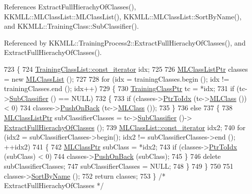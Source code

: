 References Extract\+Full\+Hierachy\+Of\+Classes(), K\+K\+M\+L\+L\+::\+M\+L\+Class\+List\+::\+M\+L\+Class\+List(), K\+K\+M\+L\+L\+::\+M\+L\+Class\+List\+::\+Sort\+By\+Name(), and K\+K\+M\+L\+L\+::\+Training\+Class\+::\+Sub\+Classifier().



Referenced by K\+K\+M\+L\+L\+::\+Training\+Process2\+::\+Extract\+Full\+Hierachy\+Of\+Classes(), and Extract\+Full\+Hierachy\+Of\+Classes().


\begin{DoxyCode}
723 \{
724   \hyperlink{class_k_k_b_1_1_k_k_queue_aeb057c9c010446f46f57c1e355f981f1}{TrainingClassList::const\_iterator}  idx;
725 
726   \hyperlink{class_k_k_m_l_l_1_1_m_l_class_list}{MLClassListPtr}  classes = \textcolor{keyword}{new} \hyperlink{class_k_k_m_l_l_1_1_m_l_class_list}{MLClassList} ();
727 
728   \textcolor{keywordflow}{for}  (idx = trainingClasses.begin ();  idx != trainingClasses.end ();  idx++)
729   \{
730     \hyperlink{class_k_k_m_l_l_1_1_training_class}{TrainingClassPtr}  tc = *idx;
731     \textcolor{keywordflow}{if}  (tc->\hyperlink{class_k_k_m_l_l_1_1_training_class_a0e7f742efd6c2cd406f57da6622a02d7}{SubClassifier} () == NULL)
732     \{
733       \textcolor{keywordflow}{if}  (classes->\hyperlink{class_k_k_b_1_1_k_k_queue_ac7c26abdf599669a4b0898534f735f99}{PtrToIdx} (tc->\hyperlink{class_k_k_m_l_l_1_1_training_class_a2f28d3ab6694f610fceeacd94ffee4ad}{MLClass} ()) < 0)
734         classes->\hyperlink{class_k_k_m_l_l_1_1_m_l_class_list_ae46d4f51c041d7d4d544bf514c484295}{PushOnBack} (tc->\hyperlink{class_k_k_m_l_l_1_1_training_class_a2f28d3ab6694f610fceeacd94ffee4ad}{MLClass} ());
735     \}
736     \textcolor{keywordflow}{else}
737     \{
738       \hyperlink{class_k_k_m_l_l_1_1_m_l_class_list}{MLClassListPtr}  subClassifierClasses = tc->\hyperlink{class_k_k_m_l_l_1_1_training_class_a0e7f742efd6c2cd406f57da6622a02d7}{SubClassifier} ()->
      \hyperlink{class_k_k_m_l_l_1_1_training_configuration2_ad52f23fe7b32835013c19d0a0fb2dcb0}{ExtractFullHierachyOfClasses} ();
739       \hyperlink{class_k_k_b_1_1_k_k_queue_aeb057c9c010446f46f57c1e355f981f1}{MLClassList::const\_iterator}  idx2;
740       \textcolor{keywordflow}{for}  (idx2 = subClassifierClasses->begin();  idx2 != subClassifierClasses->end ();  ++idx2)
741       \{
742         \hyperlink{class_k_k_m_l_l_1_1_m_l_class}{MLClassPtr}       subClass = *idx2;
743         \textcolor{keywordflow}{if}  (classes->\hyperlink{class_k_k_b_1_1_k_k_queue_ac7c26abdf599669a4b0898534f735f99}{PtrToIdx} (subClass) < 0)
744           classes->\hyperlink{class_k_k_m_l_l_1_1_m_l_class_list_ae46d4f51c041d7d4d544bf514c484295}{PushOnBack} (subClass);
745       \}
746       \textcolor{keyword}{delete}  subClassifierClasses;
747       subClassifierClasses = NULL;
748     \}
749   \}
750 
751   classes->\hyperlink{class_k_k_m_l_l_1_1_m_l_class_list_a00b4e0ed01e65ca7e6c21c285ea45c02}{SortByName} ();
752   \textcolor{keywordflow}{return}  classes;
753 \}  \textcolor{comment}{/* ExtractFullHierachyOfClasses */}
\end{DoxyCode}
